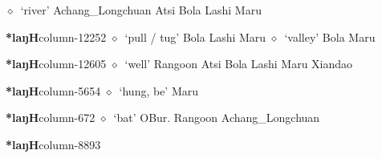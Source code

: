          $\diamond$~`river'
         Achang\_Longchuan 
\hspace{1ex}
         Atsi 
\hspace{1ex}
         Bola 
\hspace{1ex}
         Lashi 
\hspace{1ex}
         Maru 
  \item {\footnotesize \textbf{*laŋH}}{\tiny column-12252}
         $\diamond$~`pull / tug'
         Bola 
\hspace{1ex}
         Lashi 
\hspace{1ex}
         Maru 
\hspace{1ex}
         $\diamond$~`valley'
         Bola 
\hspace{1ex}
         Maru 
  \item {\footnotesize \textbf{*laŋH}}{\tiny column-12605}
         $\diamond$~`well'
         Rangoon 
\hspace{1ex}
         Atsi 
\hspace{1ex}
         Bola 
\hspace{1ex}
         Lashi 
\hspace{1ex}
         Maru 
\hspace{1ex}
         Xiandao 
  \item {\footnotesize \textbf{*laŋH}}{\tiny column-5654}
         $\diamond$~`hung, be'
         Maru 
  \item {\footnotesize \textbf{*laŋH}}{\tiny column-672}
         $\diamond$~`bat'
         OBur. 
\hspace{1ex}
         Rangoon 
\hspace{1ex}
         Achang\_Longchuan 
  \item {\footnotesize \textbf{*laŋH}}{\tiny column-8893}
